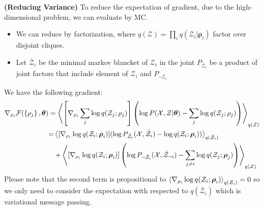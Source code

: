 \begin{remark}{\textbf{(Reducing Variance)}}
    To reduce the expectation of gradient, due to the high-dimensional problem, we can evaluate by MC. 
    \begin{itemize}
        \item We can reduce by factorization, where $q(\mathcal{Z}) = \prod_iq(\mathcal{Z}_i | \boldsymbol \rho_i)$ factor over disjoint cliques. 
        \item Let $\bar{\mathcal{Z}}_i$ be the minimal markov blancket of $\mathcal{Z}_i$ in the joint $P_{\bar{\mathcal{Z}}_i}$ be a product of joint factors that include element of $\mathcal{Z}_i$ and $P_{\neg \bar{\mathcal{Z}}_i}$
    \end{itemize}
    We have the following gradient:
    \begin{equation*}
    \begin{aligned}
        \nabla_{\rho_i}\mathcal{F}(\left\{ \rho_j \right\}, \boldsymbol \theta) &= \left\langle \left[ \nabla_{\rho_i} \sum_j\log q(\mathcal{Z}_j ; \rho_j)  \right] \left( \log P(\mathcal{X}, \mathcal{Z} | \boldsymbol \theta) - \sum_j \log q(\mathcal{Z}_j ; \rho_j) \right)  \right\rangle_{q(\mathcal{Z})} \\
        &\begin{aligned}
            = &\left\langle  [\nabla_{\rho_i} \log q(\mathcal{Z}_i;\boldsymbol \rho_i)] (\log P_{\bar{\mathcal{Z}}_i}(\mathcal{X}, \bar{\mathcal{Z}}_i ) - \log q(\mathcal{Z}_i ; \boldsymbol \rho_i) )  \right\rangle_{q(\bar{\mathcal{Z}}_i)} \\
            &+\left\langle  [\nabla_{\rho_i} \log q(\mathcal{Z}_i;\boldsymbol \rho_i)]\left(  \log P_{\neg \bar{\mathcal{Z}}_i}(\mathcal{X}, \bar{\mathcal{Z}}_{\neg i}) - \sum_{j\ne i} \log q(\mathcal{Z}_j ; \boldsymbol \rho_j)  \right)  \right\rangle_{q(\mathcal{Z})}
        \end{aligned}
    \end{aligned}
    \end{equation*}
    Please note that the second term is propositional to $\left\langle \nabla_{\rho_i}\log q(\mathcal{Z}_i; \boldsymbol \rho_i) \right\rangle_{q(\mathcal{Z}_i)} = 0$ so we only need to consider the expectation with respected to $q(\bar{\mathcal{Z}}_i)$ which is variational message passing. 
\end{remark}


